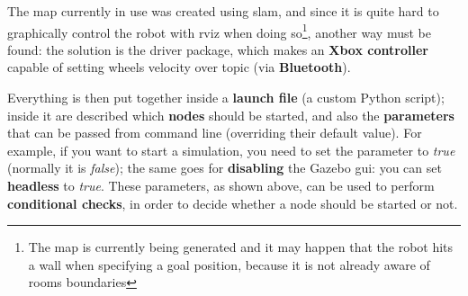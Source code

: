 The map currently in use was created using \acrshort{slam}, and since it is quite hard to graphically control the robot with \acrshort{rviz} when doing so\footnote{The map is currently being generated and it may happen that the robot hits a wall when specifying a goal position, because it is not already aware of rooms boundaries}, another way must be found: the solution is the  driver package, which makes an \textbf{Xbox controller} capable of setting wheels velocity over  topic (via \textbf{Bluetooth}).

Everything is then put together inside a \textbf{launch file} (a custom Python script); inside it are described which \textbf{nodes} should be started, and also the \textbf{parameters} that can be passed from command line (overriding their default value). For example, if you want to start a simulation, you need to set the  parameter to \textit{true} (normally it is \textit{false}); the same goes for \textbf{disabling} the Gazebo \acrfull{gui}: you can set \textbf{headless} to \textit{true}. These parameters, as shown above, can be used to perform \textbf{conditional checks}, in order to decide whether a node should be started or not.
